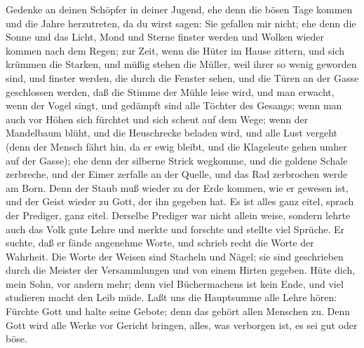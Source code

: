  Gedenke an deinen Schöpfer in deiner Jugend, ehe denn die
bösen Tage kommen und die Jahre herzutreten, da du wirst sagen: Sie
gefallen mir nicht;  ehe denn die Sonne und das Licht, Mond
und Sterne finster werden und Wolken wieder kommen nach dem Regen;
 zur Zeit, wenn die Hüter im Hause zittern, und sich krümmen
die Starken, und müßig stehen die Müller, weil ihrer so wenig geworden
sind, und finster werden, die durch die Fenster sehen,  und
die Türen an der Gasse geschlossen werden, daß die Stimme der Mühle
leise wird, und man erwacht, wenn der Vogel singt, und gedämpft sind
alle Töchter des Gesangs;  wenn man auch vor Höhen sich
fürchtet und sich scheut auf dem Wege; wenn der Mandelbaum blüht, und
die Heuschrecke beladen wird, und alle Lust vergeht (denn der Mensch
fährt hin, da er ewig bleibt, und die Klageleute gehen umher auf der
Gasse);  ehe denn der silberne Strick wegkomme, und die
goldene Schale zerbreche, und der Eimer zerfalle an der Quelle, und das
Rad zerbrochen werde am Born.  Denn der Staub muß wieder zu
der Erde kommen, wie er gewesen ist, und der Geist wieder zu Gott, der
ihn gegeben hat.  Es ist alles ganz eitel, sprach der
Prediger, ganz eitel.  Derselbe Prediger war nicht allein
weise, sondern lehrte auch das Volk gute Lehre und merkte und forschte
und stellte viel Sprüche.  Er suchte, daß er fände
angenehme Worte, und schrieb recht die Worte der Wahrheit. 
Die Worte der Weisen sind Stacheln und Nägel; sie sind geschrieben durch
die Meister der Versammlungen und von einem Hirten gegeben.
 Hüte dich, mein Sohn, vor andern mehr; denn viel
Büchermachens ist kein Ende, und viel studieren macht den Leib müde.
 Laßt uns die Hauptsumme alle Lehre hören: Fürchte Gott und
halte seine Gebote; denn das gehört allen Menschen zu. 
Denn Gott wird alle Werke vor Gericht bringen, alles, was verborgen ist,
es sei gut oder böse.
